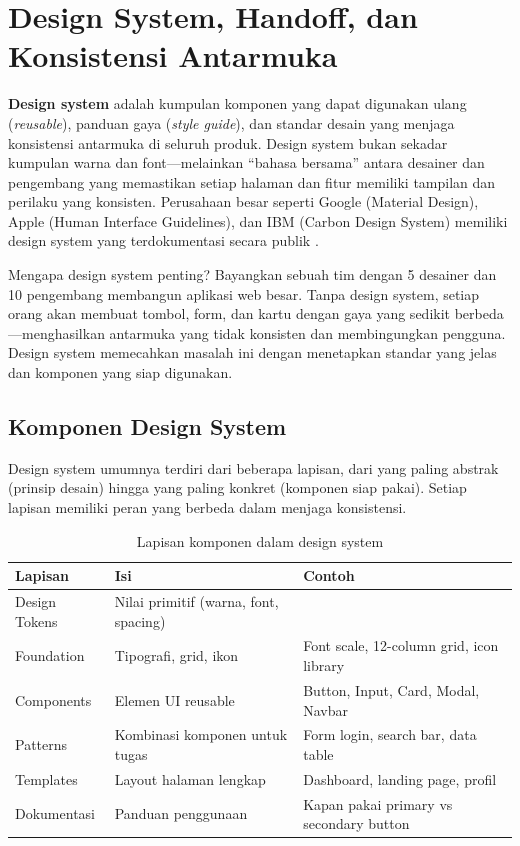 \section{Design System, Handoff, dan Konsistensi Antarmuka}

\textbf{Design system} adalah kumpulan komponen yang dapat digunakan ulang (\textit{reusable}), panduan gaya (\textit{style guide}), dan standar desain yang menjaga konsistensi antarmuka di seluruh produk. Design system bukan sekadar kumpulan warna dan font---melainkan ``bahasa bersama'' antara desainer dan pengembang yang memastikan setiap halaman dan fitur memiliki tampilan dan perilaku yang konsisten. Perusahaan besar seperti Google (Material Design), Apple (Human Interface Guidelines), dan IBM (Carbon Design System) memiliki design system yang terdokumentasi secara publik \cite{webdevLearn}.

Mengapa design system penting? Bayangkan sebuah tim dengan 5 desainer dan 10 pengembang membangun aplikasi web besar. Tanpa design system, setiap orang akan membuat tombol, form, dan kartu dengan gaya yang sedikit berbeda---menghasilkan antarmuka yang tidak konsisten dan membingungkan pengguna. Design system memecahkan masalah ini dengan menetapkan standar yang jelas dan komponen yang siap digunakan.

\subsection{Komponen Design System}

Design system umumnya terdiri dari beberapa lapisan, dari yang paling abstrak (prinsip desain) hingga yang paling konkret (komponen siap pakai). Setiap lapisan memiliki peran yang berbeda dalam menjaga konsistensi.

\begin{table}[htbp]
\centering
\begin{tabular}{|P{3.5cm}|P{4cm}|P{4.5cm}|}
\hline
\textbf{Lapisan} & \textbf{Isi} & \textbf{Contoh} \\
\hline
Design Tokens & Nilai primitif (warna, font, spacing) &  \\
\hline
Foundation & Tipografi, grid, ikon & Font scale, 12-column grid, icon library \\
\hline
Components & Elemen UI reusable & Button, Input, Card, Modal, Navbar \\
\hline
Patterns & Kombinasi komponen untuk tugas & Form login, search bar, data table \\
\hline
Templates & Layout halaman lengkap & Dashboard, landing page, profil \\
\hline
Dokumentasi & Panduan penggunaan & Kapan pakai primary vs secondary button \\
\hline
\end{tabular}
\caption{Lapisan komponen dalam design system}
\end{table}

